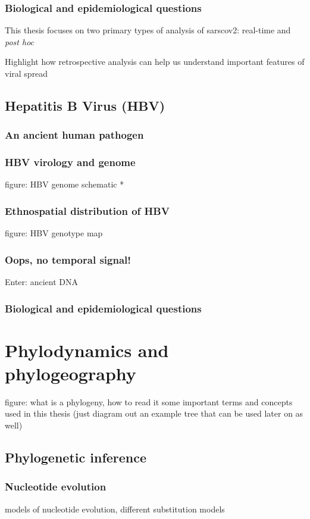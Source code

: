 \subsubsection{Biological and epidemiological questions}
This thesis focuses on two primary types of analysis of \gls{sarscov2}: real-time and \textit{post hoc} 

Highlight how retrospective analysis can help us understand important features of viral spread

    \subsection{Hepatitis B Virus (HBV)}
      \subsubsection{An ancient human pathogen}
      \subsubsection{HBV virology and genome}
      figure: HBV genome schematic *
      \subsubsection{Ethnospatial distribution of HBV}
      figure: HBV genotype map
      \subsubsection{Oops, no temporal signal!}
      Enter: ancient DNA
      \subsubsection{Biological and epidemiological questions}

  \section{Phylodynamics and phylogeography}
  figure: what is a phylogeny, how to read it
  some important terms and concepts used in this thesis (just diagram out an example tree that can be used later on as well)

    \subsection{Phylogenetic inference}

      \subsubsection{Nucleotide evolution}
      models of nucleotide evolution, different substitution models
